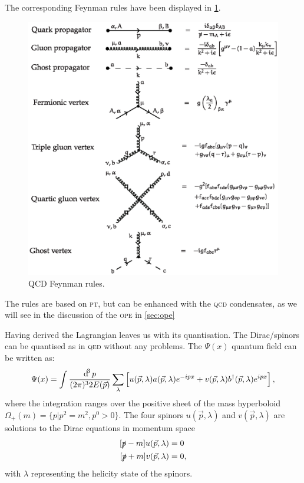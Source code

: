 \documentclass[../../index.tex]{subfiles}
\begin{document}
The corresponding Feynman rules have been displayed in
\cref{fig:qcdFeynmanRules}.
\begin{figure}
  \includegraphics[width=\textwidth]{./images/qcdFeynmanRules.eps}
  \caption{QCD Feynman rules.}
  \label{fig:qcdFeynmanRules}
\end{figure}
The rules are based on \textsc{pt}, but can be enhanced with the \textsc{qcd}
condensates, as we will see in the discussion of the \textsc{ope} in
\cref{sec:ope}

Having derived the Lagrangian leaves us with its quantisation. The
Dirac\-/spinors can be quantised as in \textsc{qed} without any problems. The
\(\Psi(x)\) quantum field can be written as:
\begin{equation}
  \Psi(x) = \int \frac{\dif^3 p}{(2\pi)^3 2E(\vec p)} \sum_\lambda \left[ u(\vec p, \lambda) a(\vec p, \lambda) e^{-ipx} + v(\vec p, \lambda) b^\dagger (\vec p, \lambda) e^{ipx} \right],
\end{equation}
where the integration ranges over the positive sheet of the mass hyperboloid
\(\Omega_+(m) = \{p \vert p^2 = m^2, p^0 > 0 \}\). The four spinors \(u(\vec p,
\lambda)\) and \(v(\vec p, \lambda)\) are solutions to the Dirac equations in
momentum space
\begin{equation}
  \begin{split}
    [\slashed p - m]u(\vec p, \lambda) &= 0 \\
    [\slashed p + m]v(\vec p, \lambda) &= 0,
  \end{split}
\end{equation}
with \(\lambda\) representing the helicity state of the spinors.
\end{document}
